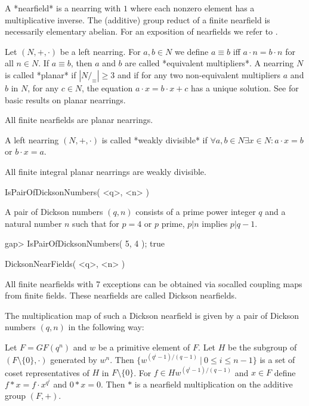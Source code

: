 %
%


A *nearfield* is a nearring with $1$ where each nonzero element has a
multiplicative inverse. The (additive) group reduct of a finite
nearfield is necessarily elementary abelian. 
For an exposition of nearfields we refer to \cite{Waehling:Fastkoerper}.

Let $(N,+,\cdot)$ be a left nearring. For $a,b \in N$ we define $a \equiv b$
iff $a\cdot n = b\cdot n$ for all $n\in N$. If $a \equiv b$, then $a$ and $b$
are called *equivalent multipliers*.
A nearring $N$ is called *planar* if $| N/_{\equiv} | \ge 3$ and if 
for any two non-equivalent multipliers $a$ and $b$ in $N$, for any $c\in N$, 
the equation $a\cdot x = b\cdot x + c$ has a unique solution. 
See \cite{Clay:Nearrings} for basic results on planar nearrings. 

All finite nearfields are planar nearrings.

A left nearring $(N,+,\cdot)$ is called *weakly divisible* if 
$\forall a,b\in N \exists x\in N : a\cdot x = b$ or $b\cdot x = a$.  

All finite integral planar nearrings are weakly divisible.




\>IsPairOfDicksonNumbers( <q>, <n> )

A pair of Dickson numbers $(q,n)$ consists of a prime power integer $q$
and a natural number $n$ such that for $p = 4$ or $p$ prime, $p|n$ implies
$p|q-1$.

\beginexample
    gap> IsPairOfDicksonNumbers( 5, 4 );
    true
\endexample



\>DicksonNearFields( <q>, <n> )

All finite nearfields with 7 exceptions can be obtained via socalled
coupling maps from finite fields. These nearfields are called Dickson
nearfields.

The multiplication map of such a Dickson nearfield is given by a pair of
Dickson numbers $(q,n)$ in the following way:
 
Let $F = GF(q^n)$ and $w$ be a primitive element of $F$. Let
$H$ be the subgroup of $(F\setminus\{0\},\cdot)$ generated by $w^n$.
Then $\{w^{(q^i-1)/(q-1)}\ |\ 0\leq i\leq n-1 \}$ is a set of coset
representatives of $H$ in $F\setminus\{0\}$.
For $f\in Hw^{(q^i-1)/(q-1)}$ and $x\in F$ define $f*x = f\cdot x^{q^i}$
and $0*x = 0$. Then $*$ is a nearfield multiplication on the additive group
$(F,+)$. 

